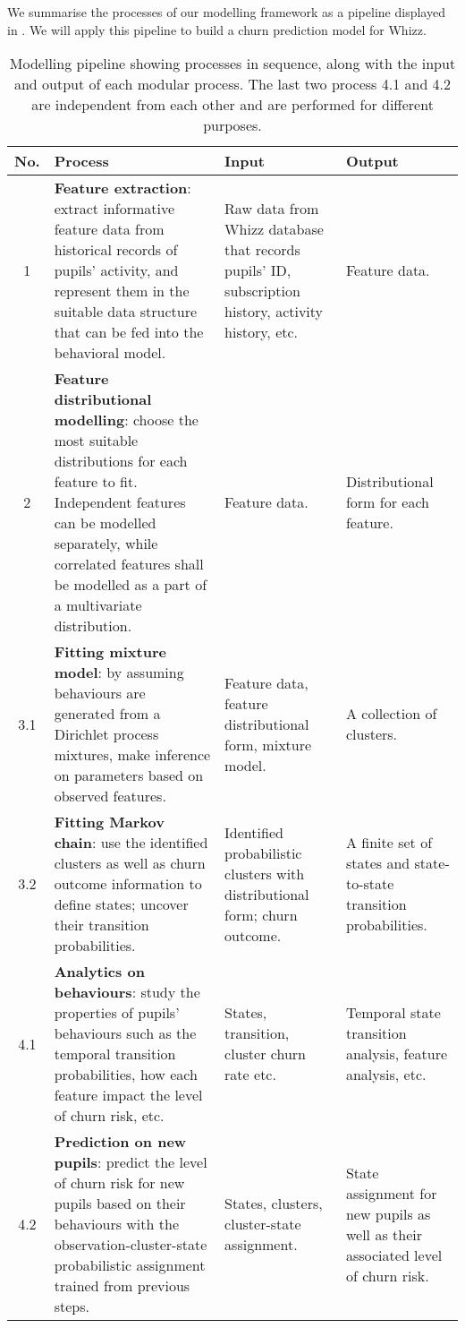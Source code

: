 \documentclass[english,a4,oneside,9pt]{extarticle}
\begin{document}
We summarise the processes of our modelling framework as a pipeline displayed in . We will apply this pipeline to build a churn prediction model for Whizz.

\begin{figure}[htb]
\centering
\end{figure}

\begin{table}[htb]
\vspace*{-5mm}
\centering
\footnotesize
\begin{tabular}{c|p{5.5cm}|p{3cm}|p{2.5cm}}
\hline
\textbf{No.} & \textbf{Process} & \textbf{Input} & \textbf{Output} \\
\hline
1 &
\textbf{Feature extraction}: extract informative feature data from historical records of pupils' activity, and represent them in the suitable data structure that can be fed into the behavioral model.&
Raw data from Whizz database that records pupils' ID, subscription history, activity history, etc. & 
Feature data. \\
\hline
2 &
\textbf{Feature distributional modelling}: choose the most suitable distributions for each feature to fit. Independent features can be modelled separately, while correlated features shall be modelled as a part of a multivariate distribution. &
Feature data. & 
Distributional form for each feature. \\
\hline
3.1 &
\textbf{Fitting mixture model}: by assuming behaviours are generated from a Dirichlet process mixtures, make inference on parameters based on observed features.&
Feature data, feature distributional form, mixture model.& 
A collection of clusters. \\
\hline
3.2 &
\textbf{Fitting Markov chain}: use the identified clusters as well as churn outcome information to define states; uncover their transition probabilities. &
Identified probabilistic clusters with distributional form; churn outcome. & 
A finite set of states and state-to-state transition probabilities. \\
\hline
4.1 &
\textbf{Analytics on behaviours}: study the properties of pupils' behaviours such as the temporal transition probabilities, how each feature impact the level of churn risk, etc. &
States, transition, cluster churn rate etc. & 
Temporal state transition analysis, feature analysis, etc. \\
\hline
4.2 &
\textbf{Prediction on new pupils}: predict the level of churn risk for new pupils based on their behaviours with the observation-cluster-state probabilistic assignment trained from previous steps. &
States, clusters, cluster-state assignment. & 
State assignment for new pupils as well as their associated level of churn risk. \\
\hline
\end{tabular}
\caption{Modelling pipeline showing processes in sequence, along with the input and output of each modular process. The last two process 4.1 and 4.2 are independent from each other and are performed for different purposes.}
\label{tab:pipeline}
\end{table}
\end{document}
